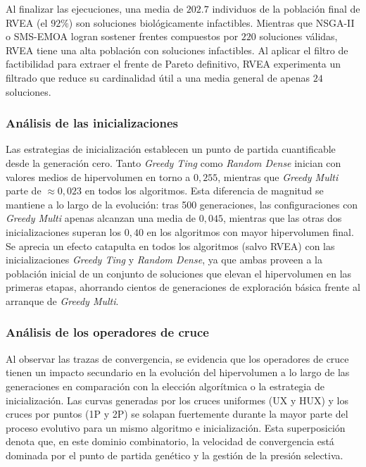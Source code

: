 Al finalizar las ejecuciones, una media de $202.7$ individuos de la población final de RVEA (el $92\%$) son soluciones biológicamente infactibles. Mientras que NSGA-II o SMS-EMOA logran sostener frentes compuestos por $220$ soluciones válidas, RVEA tiene una alta población con soluciones infactibles. Al aplicar el filtro de factibilidad para extraer el frente de Pareto definitivo, RVEA experimenta un filtrado que reduce su cardinalidad útil a una media general de apenas $24$ soluciones.

\subsubsection{Análisis de las inicializaciones}

Las estrategias de inicialización establecen un punto de partida cuantificable desde la generación cero. Tanto \textit{Greedy Ting} como \textit{Random Dense} inician con valores medios de hipervolumen en torno a $0{,}255$, mientras que \textit{Greedy Multi} parte de $\approx 0{,}023$ en todos los algoritmos. Esta diferencia de magnitud se mantiene a lo largo de la evolución: tras 500 generaciones, las configuraciones con \textit{Greedy Multi} apenas alcanzan una media de $0{,}045$, mientras que las otras dos inicializaciones superan los $0{,}40$ en los algoritmos con mayor hipervolumen final. Se aprecia un efecto catapulta en todos los algoritmos (salvo RVEA) con las inicializaciones \textit{Greedy Ting} y \textit{Random Dense}, ya que ambas proveen a la población inicial de un conjunto de soluciones que elevan el hipervolumen en las primeras etapas, ahorrando cientos de generaciones de exploración básica frente al arranque de \textit{Greedy Multi}.

\subsubsection{Análisis de los operadores de cruce}

Al observar las trazas de convergencia, se evidencia que los operadores de cruce tienen un impacto secundario en la evolución del hipervolumen a lo largo de las generaciones en comparación con la elección algorítmica o la estrategia de inicialización. Las curvas generadas por los cruces uniformes (UX y HUX) y los cruces por puntos (1P y 2P) se solapan fuertemente durante la mayor parte del proceso evolutivo para un mismo algoritmo e inicialización. Esta superposición denota que, en este dominio combinatorio, la velocidad de convergencia está dominada por el punto de partida genético y la gestión de la presión selectiva. 

